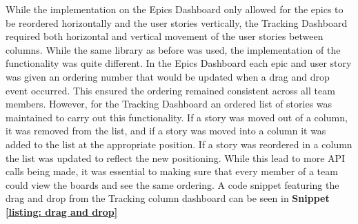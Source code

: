 \documentclass[l4proj.tex]{subfiles}
\begin{document}
While the implementation on the Epics Dashboard only allowed for the epics to be reordered horizontally and the user stories vertically, the Tracking Dashboard required both horizontal and vertical movement of the user stories between columns. While the same library as before was used, the implementation of the functionality was quite different. In the Epics Dashboard each epic and user story was given an ordering number that would be updated when a drag and drop event occurred. This ensured the ordering remained consistent across all team members. However, for the Tracking Dashboard an ordered list of stories was maintained to carry out this functionality. If a story was moved out of a column, it was removed from the list, and if a story was moved into a column it was added to the list at the appropriate position. If a story was reordered in a column the list was updated to reflect the new positioning. While this lead to more API calls being made, it was essential to making sure that every member of a team could view the boards and see the same ordering. A code snippet featuring the drag and drop from the Tracking column dashboard can be seen in \textbf{Snippet \ref{listing: drag and drop}}
\end{document}
